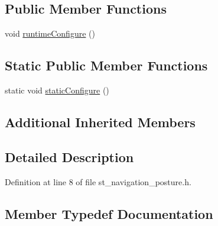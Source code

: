 \subsection*{Public Member Functions}
\begin{DoxyCompactItemize}
\item 
void \hyperlink{structsm__moveit__screw__loop_1_1pick__states_1_1StNavigationPosture_afe3f2a941d6ad586925db22af5c8cc89}{runtime\+Configure} ()
\end{DoxyCompactItemize}
\subsection*{Static Public Member Functions}
\begin{DoxyCompactItemize}
\item 
static void \hyperlink{structsm__moveit__screw__loop_1_1pick__states_1_1StNavigationPosture_aceb3ac6c28027eb0d3b92752fc1dc978}{static\+Configure} ()
\end{DoxyCompactItemize}
\subsection*{Additional Inherited Members}


\subsection{Detailed Description}


Definition at line 8 of file st\+\_\+navigation\+\_\+posture.\+h.



\subsection{Member Typedef Documentation}
\mbox{\label{structsm__moveit__screw__loop_1_1pick__states_1_1StNavigationPosture_a4f22b6ddea2186c8f2a16859c03928e9}} 
